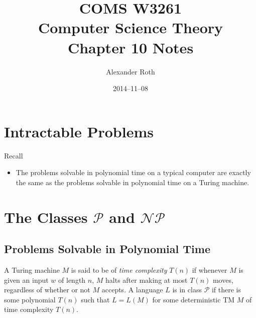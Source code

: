 \documentclass[]{article}
\begin{document}
\title{COMS W3261 \\ Computer Science Theory \\ Chapter 10 Notes}
\author{Alexander Roth}
\date{2014--11--08}
\maketitle
\theoremstyle{definition}
\newtheorem{thm}{Theorem}
\section*{Intractable Problems}
Recall
\begin{itemize}
\item The problems solvable in polynomial time on a typical computer are exactly
the same as the problems solvable in polynomial time on a Turing machine.
\end{itemize}

\section*{The Classes $\mathcal{P}$ and $\mathcal{NP}$}
\subsection*{Problems Solvable in Polynomial Time}
A Turing machine $M$ is said to be of \emph{time complexity} $T(n)$ if whenever
$M$ is given an input $w$ of length $n$, $M$ halts after making at most $T(n)$
moves, regardless of whether or not $M$ accepts. A language $L$ is in class
$\mathcal{P}$ if there is some polynomial $T(n)$ such that $L = L(M)$ for some
deterministic TM $M$ of time complexity $T(n)$.
\end{document}
